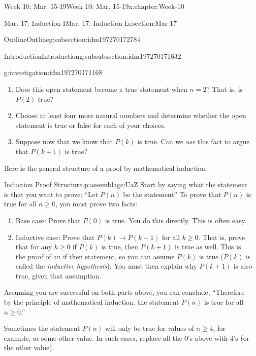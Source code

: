 \documentclass[oneside,10pt,]{book}
\numberwithin{equation}{section}
\renewcommand{\ge}{\geqslant}
\def\imp{\to}
\newcommand{\imp}{\rightarrow}
\begin{document}
\begin{chapterptx}{Week 10: Mar. 15-19}{}{Week 10: Mar. 15-19}{}{}{x:chapter:Week-10}
\begin{sectionptx}{Mar. 17: Induction I}{}{Mar. 17: Induction I}{}{}{x:section:Mar-17}
\begin{subsectionptx}{Outline}{}{Outline}{}{}{g:subsection:idm197270172784}
\begin{subsubsectionptx}{Introduction}{}{Introduction}{}{}{g:subsubsection:idm197270171632}
\begin{investigation}{}{g:investigation:idm197270171168}
\begin{enumerate}
\item{}Does this open statement become a true statement when \(n=2\)? That is, is \(P(2)\) true?%
\item{}Choose at least four more natural numbers and determine whether the open statement is true or false for each of your choices.%
\item{}Suppose now that we know that \(P(k)\) is true. Can we \emph{use} this fact to argue that \(P(k+1)\) is true?%
\end{enumerate}
\end{investigation}%
Here is the general structure of a proof by mathematical induction:%
\begin{assemblage}{Induction Proof Structure.}{p:assemblage:UaZ}%
 Start by saying what the statement is that you want to prove: ``Let \(P(n)\) be the statement\textellipsis{}'' To prove that \(P(n)\) is true for all \(n \ge 0\), you must prove two facts:%
\begin{enumerate}
\item{} Base case: Prove that \(P(0)\) is true. You do this directly. This is often easy.%
\item{} Inductive case: Prove that \(P(k) \imp P(k+1)\) for all \(k \ge 0\). That is, prove that for any \(k \ge 0\) if \(P(k)\) is true, then \(P(k+1)\) is true as well. This is the proof of an if \textellipsis{} then \textellipsis{} statement, so you can assume \(P(k)\) is true (\(P(k)\) is called the \emph{inductive hypothesis}).  You must then explain why \(P(k+1)\) is also true, given that assumption.%
\end{enumerate}
%
\par
Assuming you are successful on both parts above, you can conclude, ``Therefore by the principle of mathematical induction, the statement \(P(n)\) is true for all \(n \ge 0\).''%
\end{assemblage}
Sometimes the statement \(P(n)\) will only be true for values of \(n \ge 4\), for example, or some other value. In such cases, replace all the 0's above with 4's (or the other value).%
\par

\end{subsubsectionptx}
\end{subsectionptx}
\end{sectionptx}
\end{chapterptx}
\end{document}
